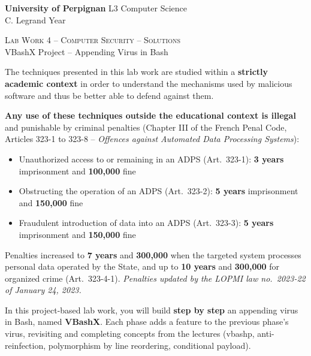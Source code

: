 \documentclass[a4paper,11pt]{article}
\theoremstyle{plain}
\theoremstyle{definition}
\begin{document}
\hbox{}
\noindent \textbf{University of Perpignan} \hfill  L3 Computer Science \\
 \hfill C. Legrand \hfill  Year \the\year  \\
\smallskip
\begin{center}
{
 {\scshape \large Lab Work 4 -- Computer Security -- Solutions}  \\
 VBashX Project -- Appending Virus in Bash
}
\end{center}
\hbox{}

\bigskip

\begin{ethique}
The techniques presented in this lab work are studied within a \textbf{strictly academic context} in order to understand the mechanisms used by malicious software and thus be better able to defend against them.

\textbf{Any use of these techniques outside the educational context is illegal} and punishable by criminal penalties (Chapter III of the French Penal Code, Articles 323-1 to 323-8 -- \textit{Offences against Automated Data Processing Systems}):
\begin{itemize}
    \item Unauthorized access to or remaining in an ADPS (Art.~323-1): \textbf{3 years} imprisonment and \textbf{\texteuro{}100,000} fine
    \item Obstructing the operation of an ADPS (Art.~323-2): \textbf{5 years} imprisonment and \textbf{\texteuro{}150,000} fine
    \item Fraudulent introduction of data into an ADPS (Art.~323-3): \textbf{5 years} imprisonment and \textbf{\texteuro{}150,000} fine
\end{itemize}
Penalties increased to \textbf{7 years} and \textbf{\texteuro{}300,000} when the targeted system processes personal data operated by the State, and up to \textbf{10 years} and \textbf{\texteuro{}300,000} for organized crime (Art.~323-4-1). \textit{Penalties updated by the LOPMI law no.~2023-22 of January 24, 2023.}
\end{ethique}

\bigskip


\noindent
In this project-based lab work, you will build \textbf{step by step} an appending virus in Bash, named \textbf{VBashX}. Each phase adds a feature to the previous phase's virus, revisiting and completing concepts from the lectures (vbashp, anti-reinfection, polymorphism by line reordering, conditional payload).
\end{document}

